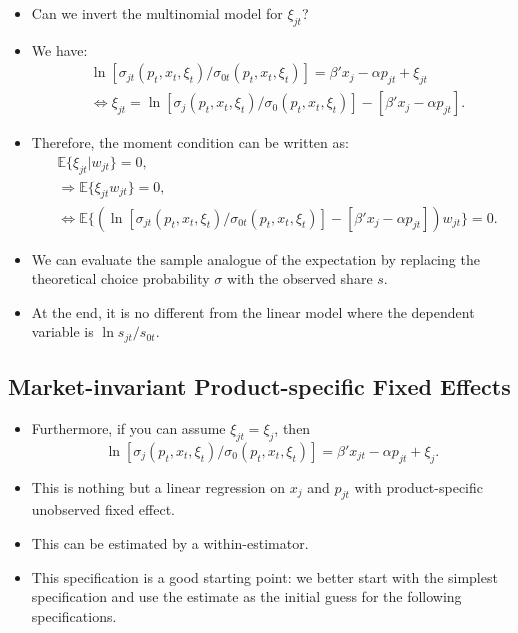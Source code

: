 \documentclass[
]{book}
\providecommand{\tightlist}{%
  \setlength{\itemsep}{0pt}\setlength{\parskip}{0pt}}
\begin{document}
\begin{itemize}
\tightlist
\item
  Can we invert the multinomial model for \(\xi_{jt}\)?
\item
  We have:
  \begin{equation}
  \begin{split}
  &\ln [\sigma_{jt}(p_t, x_t, \xi_t) / \sigma_{0t}(p_t, x_t, \xi_t)] = \beta' x_j - \alpha p_{jt} + \xi_{jt}\\
  &\Leftrightarrow \xi_{jt} = \ln [\sigma_j(p_t, x_t, \xi_t) / \sigma_0(p_t, x_t, \xi_t)] - [\beta' x_j - \alpha p_{jt}].
  \end{split}
  \end{equation}
\item
  Therefore, the moment condition can be written as:
  \begin{equation}
  \begin{split}
  &\mathbb{E}\{\xi_{jt}|w_{jt}\} = 0,\\
  &\Rightarrow \mathbb{E}\{\xi_{jt} w_{jt}\} = 0,\\
  &\Leftrightarrow \mathbb{E}\{(\ln [\sigma_{jt}(p_t, x_t, \xi_t) / \sigma_{0t}(p_t, x_t, \xi_t)] - [\beta' x_j - \alpha p_{jt}]) w_{jt}  \} = 0.
  \end{split}
  \end{equation}
\item
  We can evaluate the sample analogue of the expectation by replacing the theoretical choice probability \(\sigma\)
  with the observed share \(s\).
\item
  At the end, it is no different from the linear model where the dependent variable is \(\ln s_{jt}/s_{0t}\).
\end{itemize}

\hypertarget{market-invariant-product-specific-fixed-effects}{%
\subsection{Market-invariant Product-specific Fixed Effects}\label{market-invariant-product-specific-fixed-effects}}

\begin{itemize}
\tightlist
\item
  Furthermore, if you can assume \(\xi_{jt} = \xi_j\), then
  \begin{equation}
  \ln [\sigma_j(p_t, x_t, \xi_t) / \sigma_0(p_t, x_t, \xi_t)] = \beta' x_{jt} - \alpha p_{jt} + \xi_{j}.
  \end{equation}
\item
  This is nothing but a linear regression on \(x_j\) and \(p_{jt}\) with product-specific unobserved fixed effect.
\item
  This can be estimated by a within-estimator.
\item
  This specification is a good starting point: we better start with the simplest specification and use the estimate as the initial guess for the following specifications.
\end{itemize}
\end{document}
